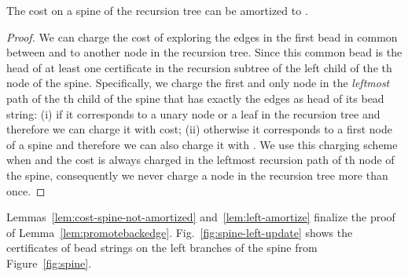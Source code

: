 \begin{lemma}
	The cost  on a spine of the
	recursion tree can be amortized to .
	\label{lem:left-amortize}
\end{lemma}
\begin{proof}
	We can charge the cost  of exploring the edges
	in the first bead in common between  and
	 to another node in the recursion tree. Since
	this common bead is the head of at least one certificate in
	the recursion subtree of the left child of the th node of
	the spine.  Specifically, we charge the first and only node in
	the \emph{leftmost} path of the th child of the spine that
	has exactly the edges  as head of its bead string:
	(i) if  it corresponds to a unary node or a
	leaf in the recursion tree and therefore we can charge it with
	 cost; (ii) otherwise it corresponds to a first node of
	a spine and therefore we can also charge it with
	. We use this charging scheme when 
	and the cost is always charged in the leftmost recursion path
	of th node of the spine, consequently we never charge a
	node in the recursion tree more than once. 
\end{proof}

Lemmas~\ref{lem:cost-spine-not-amortized} and~\ref{lem:left-amortize}
finalize the proof of Lemma~\ref{lem:promotebackedge}. 
Fig.~\ref{fig:spine-left-update} shows the certificates of bead strings
 on the left branches of the spine from
Figure~\ref{fig:spine}.




